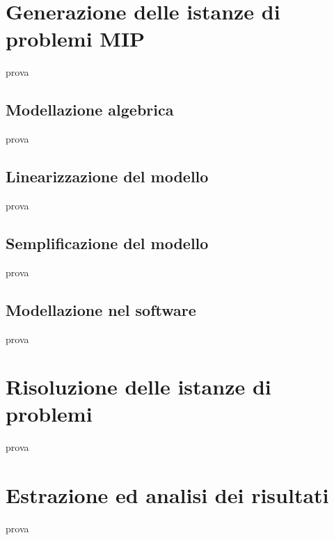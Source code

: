 \section{Generazione delle istanze di problemi MIP}
prova

\subsection{Modellazione algebrica}
prova

\subsection{Linearizzazione del modello}
prova

\subsection{Semplificazione del modello}
prova

\subsection{Modellazione nel software}
prova




\section{Risoluzione delle istanze di problemi}
prova




\section{Estrazione ed analisi dei risultati}
prova